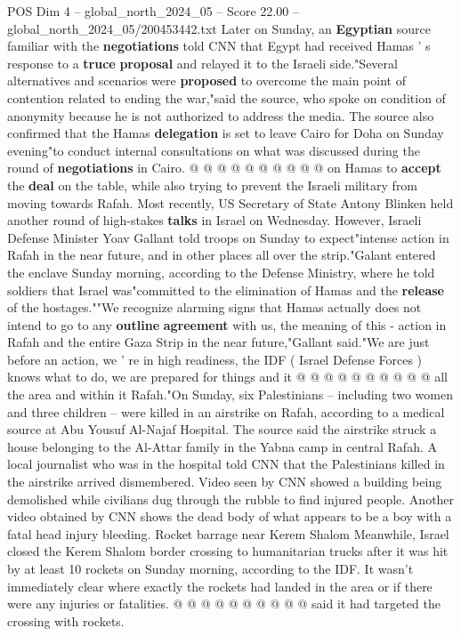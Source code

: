 \begin{textsample}{POS Dim 4 – global\_north\_2024\_05 – Score 22.00 – global\_north\_2024\_05/200453442.txt}
Later on Sunday, an \textbf{Egyptian} source familiar with the \textbf{negotiations} told CNN that Egypt had received Hamas ' s response to a \textbf{truce} \textbf{proposal} and relayed it to the Israeli side."Several alternatives and scenarios were \textbf{proposed} to overcome the main point of contention related to ending the war,"said the source, who spoke on condition of anonymity because he is not authorized to address the media.
The source also confirmed that the Hamas \textbf{delegation} is set to leave Cairo for Doha on Sunday evening"to conduct internal consultations on what was discussed during the round of \textbf{negotiations} in Cairo. @ @ @ @ @ @ @ @ @ @ on Hamas to \textbf{accept} the \textbf{deal} on the table, while also trying to prevent the Israeli military from moving towards Rafah.
Most recently, US Secretary of State Antony Blinken held another round of high-stakes \textbf{talks} in Israel on Wednesday.
However, Israeli Defense Minister Yoav Gallant told troops on Sunday to expect"intense action in Rafah in the near future, and in other places all over the strip."Galant entered the enclave Sunday morning, according to the Defense Ministry, where he told soldiers that Israel was"committed to the elimination of Hamas and the \textbf{release} of the hostages.""We recognize alarming signs that Hamas actually does not intend to go to any \textbf{outline} \textbf{agreement} with us, the meaning of this - action in Rafah and the entire Gaza Strip in the near future,"Gallant said."We are just before an action, we ' re in high readiness, the IDF ( Israel Defense Forces ) knows what to do, we are prepared for things and it @ @ @ @ @ @ @ @ @ @ all the area and within it Rafah."On Sunday, six Palestinians -- including two women and three children -- were killed in an airstrike on Rafah, according to a medical source at Abu Yousuf Al-Najaf Hospital.
The source said the airstrike struck a house belonging to the Al-Attar family in the Yabna camp in central Rafah.
A local journalist who was in the hospital told CNN that the Palestinians killed in the airstrike arrived dismembered.
Video seen by CNN showed a building being demolished while civilians dug through the rubble to find injured people.
Another video obtained by CNN shows the dead body of what appears to be a boy with a fatal head injury bleeding.
Rocket barrage near Kerem Shalom Meanwhile, Israel closed the Kerem Shalom border crossing to humanitarian trucks after it was hit by at least 10 rockets on Sunday morning, according to the IDF.
It wasn't immediately clear where exactly the rockets had landed in the area or if there were any injuries or fatalities. @ @ @ @ @ @ @ @ @ @ said it had targeted the crossing with rockets.

\end{textsample}

